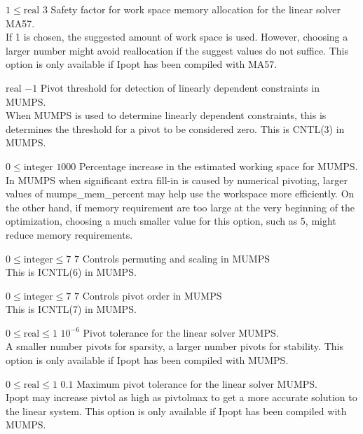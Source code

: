 %
{$1\leq\textrm{real}$}%
{$3$}%
{Safety factor for work space memory allocation for the linear solver MA57.\\
If 1 is chosen, the suggested amount of work space is used.  However, choosing a larger number might avoid reallocation if the suggest values do not suffice.  This option is only available if Ipopt has been compiled with MA57.}%
{}

%
{$\textrm{real}$}%
{$-1$}%
{Pivot threshold for detection of linearly dependent constraints in MUMPS.\\
When MUMPS is used to determine linearly dependent constraints, this is determines the threshold for a pivot to be considered zero.  This is CNTL(3) in MUMPS.}%
{}

%
{$0\leq\textrm{integer}$}%
{$1000$}%
{Percentage increase in the estimated working space for MUMPS.\\
In MUMPS when significant extra fill-in is caused by numerical pivoting, larger values of mumps\_mem\_percent may help use the workspace more efficiently.  On the other hand, if memory requirement are too large at the very beginning of the optimization, choosing a much smaller value for this option, such as 5, might reduce memory requirements.}%
{}

%
{$0\leq\textrm{integer}\leq7$}%
{$7$}%
{Controls permuting and scaling in MUMPS\\
This is ICNTL(6) in MUMPS.}%
{}

%
{$0\leq\textrm{integer}\leq7$}%
{$7$}%
{Controls pivot order in MUMPS\\
This is ICNTL(7) in MUMPS.}%
{}

%
{$0\leq\textrm{real}\leq1$}%
{$10^{- 6}$}%
{Pivot tolerance for the linear solver MUMPS.\\
A smaller number pivots for sparsity, a larger number pivots for stability.  This option is only available if Ipopt has been compiled with MUMPS.}%
{}

%
{$0\leq\textrm{real}\leq1$}%
{$0.1$}%
{Maximum pivot tolerance for the linear solver MUMPS.\\
Ipopt may increase pivtol as high as pivtolmax to get a more accurate solution to the linear system.  This option is only available if Ipopt has been compiled with MUMPS.}%
{}


